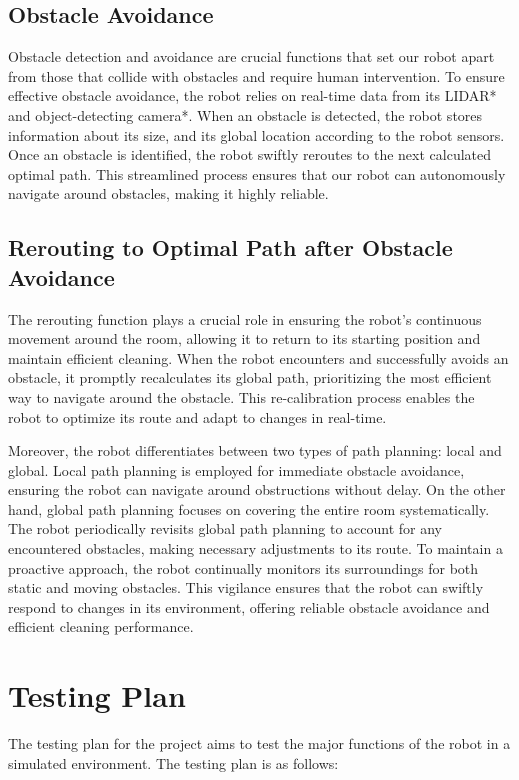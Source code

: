 \documentclass[12pt]{article}
\begin{document}
\subsection{Obstacle Avoidance}
Obstacle detection and avoidance are crucial functions that set our robot apart from those that collide with obstacles and require human intervention. To ensure effective obstacle avoidance, the robot relies on real-time data from its LIDAR* and object-detecting camera*. When an obstacle is detected, the robot stores information about its size, and its global location according to the robot sensors. Once an obstacle is identified, the robot swiftly reroutes to the next calculated optimal path. This streamlined process ensures that our robot can autonomously navigate around obstacles, making it highly reliable.

\subsection{Rerouting to Optimal Path after Obstacle Avoidance}
The rerouting function plays a crucial role in ensuring the robot's continuous movement around the room, allowing it to return to its starting position and maintain efficient cleaning. When the robot encounters and successfully avoids an obstacle, it promptly recalculates its global path, prioritizing the most efficient way to navigate around the obstacle. This re-calibration process enables the robot to optimize its route and adapt to changes in real-time.

Moreover, the robot differentiates between two types of path planning: local and global. Local path planning is employed for immediate obstacle avoidance, ensuring the robot can navigate around obstructions without delay. On the other hand, global path planning focuses on covering the entire room systematically. The robot periodically revisits global path planning to account for any encountered obstacles, making necessary adjustments to its route. To maintain a proactive approach, the robot continually monitors its surroundings for both static and moving obstacles. This vigilance ensures that the robot can swiftly respond to changes in its environment, offering reliable obstacle avoidance and efficient cleaning performance.

\section{Testing Plan}
The testing plan for the project aims to test the major functions of the robot in a simulated environment. The testing plan is as follows:
\end{document}
